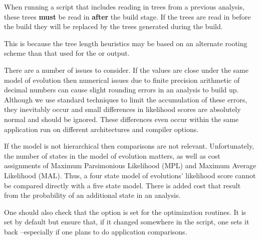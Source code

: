 {When running a script that includes reading in trees from a previous analysis, these trees {\bf must} be read 
in {\bf after} the build stage.  If the trees are read in before the build they will be replaced by the trees 
generated during the build.}

{This is because the tree length heuristics may be based on an alternate rooting scheme than that 
used for the  or  output.}

{There are a number of issues to consider. If the values are close under the same model of
evolution then numerical issues due to finite precision arithmetic of decimal numbers can cause
slight rounding errors in an analysis to build up. Although we use standard techniques to limit the
accumulation of these errors, they inevitably occur and small differences in likelihood scores are
absolutely normal and should be ignored. These differences even occur within the same application
run on different architectures and compiler options.

If the model is not hierarchical then comparisons are not relevant. Unfortunately, the number of
states in the model of evolution matters, as well as cost assignments of Maximum Parsimonious
Likelihood (MPL) and Maximum Average Likelihood (MAL). Thus, a four state model of evolutions'
likelihood score cannot be compared directly with a five state model. There is added cost that
result from the probability of an additional state in an analysis. 

One should also check that the  option is set for the optimization routines.
It is set by default but ensure that, if it changed somewhere in the script, one sets it back
--especially if one plans to do application comparisons.}
